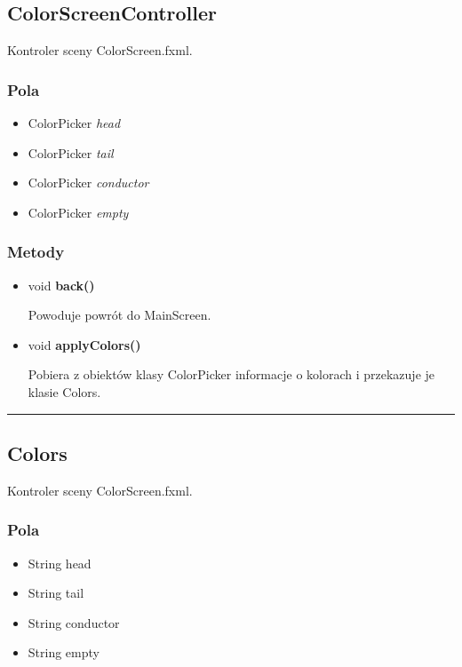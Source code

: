 \documentclass[a4paper,11pt]{article}
\newcommand{\linia}{\rule{\linewidth}{0.4mm}}
\begin{document}
\subsection{ColorScreenController}
Kontroler sceny ColorScreen.fxml.
\subsubsection{Pola}
\begin{itemize}
\item ColorPicker \textit{head}
\item ColorPicker \textit{tail}
\item ColorPicker \textit{conductor}
\item ColorPicker \textit{empty}

\end{itemize}
\subsubsection{Metody}
\begin{itemize}
\item void \textbf{back()}

Powoduje powrót do MainScreen.
\item void \textbf{applyColors()}

Pobiera z obiektów klasy ColorPicker informacje o kolorach i przekazuje je klasie Colors.

\end{itemize}
\noindent\linia




\subsection{Colors}
Kontroler sceny ColorScreen.fxml.
\subsubsection{Pola}
\begin{itemize}
\item String head
\item String tail
\item String conductor
\item String empty

\end{itemize}
\end{document}
